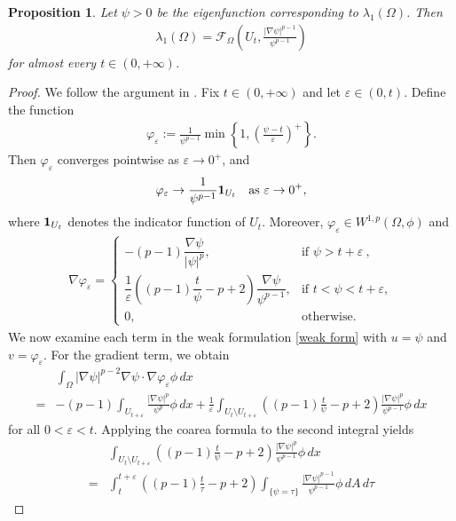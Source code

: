 \documentclass[11pt,leqno]{amsart}
\newtheorem{proposition}{Proposition}[section]
\numberwithin{equation}{section}
\begin{document}
\begin{proposition}\label{prop4.1}
    Let $\psi > 0$ be the eigenfunction   corresponding to $\lambda_1(\Omega)$. Then
\begin{align*}
\lambda_1(\Omega) = \mathcal{F}_\Omega\left(U_t, \frac{|\nabla \psi|^{p-1}}{\psi^{p-1}}\right)
\end{align*}
for almost every $t \in (0, +\infty)$.
\end{proposition}

\begin{proof}
    We follow the argument in \cite{BucurCV}.
Fix $t \in (0,+\infty)$ and let $\varepsilon \in (0,t)$. Define the function
\begin{align*}
\varphi_\varepsilon := \frac{1}{\psi^{p-1}} \min\left\{ 1, \left( \frac{\psi - t}{\varepsilon} \right)^+ \right\}.
\end{align*}
Then $\varphi_\varepsilon$ 	 converges pointwise as
$\varepsilon \to 0^+$, and
\begin{equation}\label{4.2}
\varphi_\varepsilon \rightarrow \frac{1}{\psi^{p-1}} {\bf 1}_{U_t} \quad \text{as 
$\varepsilon \to 0^+$},
\end{equation}
where ${\bf 1}_{U_t}$ denotes the indicator function of $U_t$. Moreover, $\varphi_\varepsilon \in W^{1,p}(\Omega,\phi )$ and 
\begin{align*}
\nabla \varphi_\varepsilon =
\begin{cases}
-(p-1) \dfrac{\nabla \psi}{|\psi|^p},
& \text{if } \psi > t + \varepsilon \ , \\[1em]
\dfrac{1}{\varepsilon} \left( (p-1)\dfrac{t}{\psi} - p + 2 \right) \dfrac{\nabla \psi}{\psi^{p-1}},
& \text{if } t < \psi < t + \varepsilon, \\[1em]
0, & \text{otherwise}.
\end{cases}
\end{align*}
We now examine each term in the weak formulation  \eqref{weak form} with $u = \psi$ and $v = \varphi_\varepsilon$. For  the gradient term, we obtain
\begin{align*}
&\int_\Omega |\nabla\psi|^{p-2} \nabla\psi \cdot \nabla\varphi_\varepsilon  \phi \, dx\\
=& -(p-1) \int_{U_{t+\varepsilon}} \frac{|\nabla\psi|^p}{\psi^p}\phi  \, dx+ \frac{1}{\varepsilon} \int_{U_t \setminus U_{t+\varepsilon}} \left( (p-1)\frac{t}{\psi} - p + 2 \right) \frac{|\nabla\psi|^p}{\psi^{p-1}} \phi \, dx
\end{align*}
for all $0 < \varepsilon < t$. Applying the coarea formula to the second integral yields
\begin{align*}
&\int_{U_t \setminus U_{t+\varepsilon}} \left( (p-1)\frac{t}{\psi} - p + 2 \right) \frac{|\nabla\psi|^p}{\psi^{p-1}} \phi \, dx\\
=& \int_t^{t+\varepsilon} \left( (p-1)\frac{t}{\tau} - p + 2 \right) \int_{\{\psi=\tau\}} \frac{|\nabla\psi|^{p-1}}{\psi^{p-1}} \phi \,dA \, d\tau
\end{align*}


\end{proof}
\end{document}
